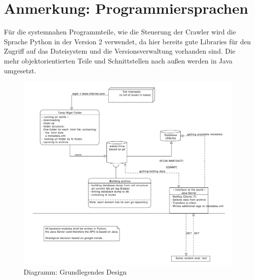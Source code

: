 \section{Anmerkung: Programmiersprachen}
Für die systemnahen Programmteile, wie die Steuerung der Crawler wird die Sprache Python in der Version 2 verwendet,
da hier bereits gute Libraries für den Zugriff auf das Dateisystem und die Versionsverwaltung vorhanden sind.
Die mehr objektorientierten Teile und Schnittstellen nach außen werden in Java umgesetzt.
 

\begin{figure}
	\centering
	\includegraphics[width=\textwidth]{spezi/webarchiv_design.pdf}
	\caption{Diagramm: Grundlegendes Design}
\end{figure}
 
